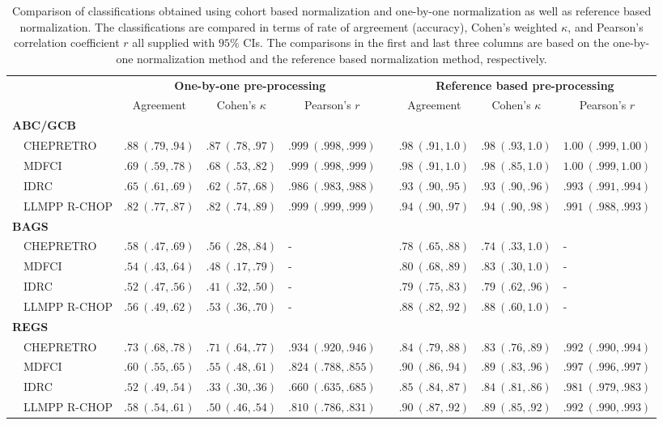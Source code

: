 \documentclass[twocolumn]{bmcart}%
\begin{document}
\begin{backmatter}
\begin{table*}[!h]%
{\footnotesize
\caption{Comparison of classifications obtained using cohort based
normalization and one-by-one normalization as well as reference based normalization.
The classifications are compared in terms of rate of argreement (accuracy),
Cohen's weighted $\kappa$, and Pearson's correlation coefficient $r$ all
supplied with $95\%$ CIs. The comparisons in the first and last three columns
are based on the one-by-one normalization method and the reference based
normalization method, respectively.\label{tab:classALL}}
\begin{center}
\begin{tabular}{llllclll}
\hline
\multicolumn{1}{l}{\bfseries }&\multicolumn{3}{c}{\bfseries One-by-one pre-processing}&\multicolumn{1}{c}{\bfseries }&\multicolumn{3}{c}{\bfseries Reference based pre-processing}\tabularnewline
\cline{2-4} \cline{6-8}
\multicolumn{1}{l}{}&\multicolumn{1}{c}{Agreement}&\multicolumn{1}{c}{Cohen's $\kappa$}&\multicolumn{1}{c}{Pearson's $r$}&\multicolumn{1}{c}{}&\multicolumn{1}{c}{Agreement}&\multicolumn{1}{c}{Cohen's $\kappa$}&\multicolumn{1}{c}{Pearson's $r$}\tabularnewline
\hline
{\bfseries ABC/GCB}&&&&&&&\tabularnewline
~~CHEPRETRO&$.88~(.79, .94)$&$.87~(.78, .97)$&$.999~(.998, .999)$&&$.98~(.91, 1.0)$&$.98~(.93, 1.0)$&$1.00~(.999, 1.00)$\tabularnewline
~~MDFCI&$.69~(.59, .78)$&$.68~(.53, .82)$&$.999~(.998, .999)$&&$.98~(.91, 1.0)$&$.98~(.85, 1.0)$&$1.00~(.999, 1.00)$\tabularnewline
~~IDRC&$.65~(.61, .69)$&$.62~(.57, .68)$&$.986~(.983, .988)$&&$.93~(.90, .95)$&$.93~(.90, .96)$&$.993~(.991, .994)$\tabularnewline
~~LLMPP R-CHOP&$.82~(.77, .87)$&$.82~(.74, .89)$&$.999~(.999, .999)$&&$.94~(.90, .97)$&$.94~(.90, .98)$&$.991~(.988, .993)$\tabularnewline
\hline
{\bfseries BAGS}&&&&&&&\tabularnewline
~~CHEPRETRO&$.58~(.47, .69)$&$.56~(.28, .84)$&-&&$.78~(.65, .88)$&$.74~(.33, 1.0)$&-\tabularnewline
~~MDFCI&$.54~(.43, .64)$&$.48~(.17, .79)$&-&&$.80~(.68, .89)$&$.83~(.30, 1.0)$&-\tabularnewline
~~IDRC&$.52~(.47, .56)$&$.41~(.32, .50)$&-&&$.79~(.75, .83)$&$.79~(.62, .96)$&-\tabularnewline
~~LLMPP R-CHOP&$.56~(.49, .62)$&$.53~(.36, .70)$&-&&$.88~(.82, .92)$&$.88~(.60, 1.0)$&-\tabularnewline
\hline
{\bfseries REGS}&&&&&&&\tabularnewline
~~CHEPRETRO&$.73~(.68, .78)$&$.71~(.64, .77)$&$.934~(.920, .946)$&&$.84~(.79, .88)$&$.83~(.76, .89)$&$.992~(.990, .994)$\tabularnewline
~~MDFCI&$.60~(.55, .65)$&$.55~(.48, .61)$&$.824~(.788, .855)$&&$.90~(.86, .94)$&$.89~(.83, .96)$&$.997~(.996, .997)$\tabularnewline
~~IDRC&$.52~(.49, .54)$&$.33~(.30, .36)$&$.660~(.635, .685)$&&$.85~(.84, .87)$&$.84~(.81, .86)$&$.981~(.979, .983)$\tabularnewline
~~LLMPP R-CHOP&$.58~(.54, .61)$&$.50~(.46, .54)$&$.810~(.786, .831)$&&$.90~(.87, .92)$&$.89~(.85, .92)$&$.992~(.990, .993)$\tabularnewline
\hline
\end{tabular}\end{center}}


\end{table*}
\end{backmatter}
\end{document}
